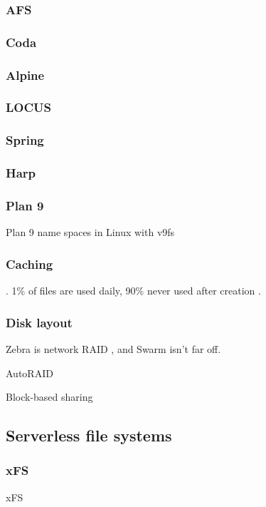 \subsubsection{AFS}
\cite{howard}
\subsubsection{Coda}
\cite{kistler,satyanarayanan}
\subsubsection{Alpine}
\cite{brown}
\subsubsection{LOCUS}
\cite{walker}
\subsubsection{Spring}
\cite{khalidi}
\subsubsection{Harp}
\cite{liskov}
\subsubsection{Plan 9}
Plan 9 \cite{pike90} name spaces \cite{pike92} in Linux with v9fs \cite{hensbergen}
\subsubsection{Caching}
\cite{dahlin94a}\cite{chaiken}\cite{blaze}\cite{dahlin94b}\cite{keleher}\cite{muthitacharoen}. 1\% of files are used daily, 90\% never used after creation \cite{gibson98b}.
\subsubsection{Disk layout}
Zebra \cite{hartman93} is network RAID \cite{patterson}, and Swarm \cite{hartman99} isn't far off.

AutoRAID \cite{wilkes95}

Block-based sharing \cite{mcgregor}

\subsection{Serverless file systems}
\cite{douceur01}\cite{douceur02}
\subsubsection{xFS}
xFS\cite{wang93,anderson95b,wang98}
